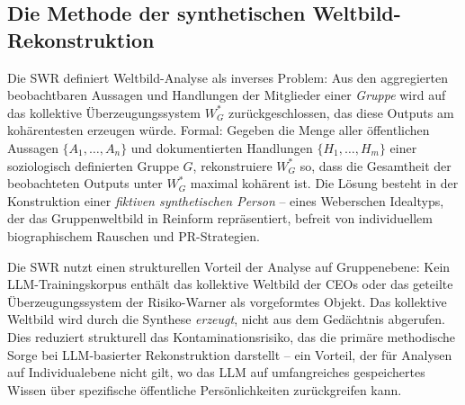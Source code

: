 \documentclass[12pt,a4paper]{article}
\begin{document}
\subsection{Die Methode der synthetischen Weltbild-Rekonstruktion}
\label{sec:methodik:swr}

Die SWR definiert Weltbild-Analyse als inverses Problem: Aus den aggregierten beobachtbaren Aussagen und Handlungen der Mitglieder einer \emph{Gruppe} wird auf das kollektive Überzeugungssystem $W_G^*$ zurückgeschlossen, das diese Outputs am kohärentesten erzeugen würde. Formal: Gegeben die Menge aller öffentlichen Aussagen $\{A_1, \ldots, A_n\}$ und dokumentierten Handlungen $\{H_1, \ldots, H_m\}$ einer soziologisch definierten Gruppe $G$, rekonstruiere $W_G^*$ so, dass die Gesamtheit der beobachteten Outputs unter $W_G^*$ maximal kohärent ist. Die Lösung besteht in der Konstruktion einer \emph{fiktiven synthetischen Person} -- eines Weberschen Idealtyps, der das Gruppenweltbild in Reinform repräsentiert, befreit von individuellem biographischem Rauschen und PR-Strategien.

Die SWR nutzt einen strukturellen Vorteil der Analyse auf Gruppenebene: Kein LLM-Trainingskorpus enthält \glqq das kollektive Weltbild der CEOs\grqq{} oder \glqq das geteilte Überzeugungssystem der Risiko-Warner\grqq{} als vorgeformtes Objekt. Das kollektive Weltbild wird durch die Synthese \emph{erzeugt}, nicht aus dem Gedächtnis abgerufen. Dies reduziert strukturell das Kontaminationsrisiko, das die primäre methodische Sorge bei LLM-basierter Rekonstruktion darstellt -- ein Vorteil, der für Analysen auf Individualebene nicht gilt, wo das LLM auf umfangreiches gespeichertes Wissen über spezifische öffentliche Persönlichkeiten zurückgreifen kann.
\end{document}
